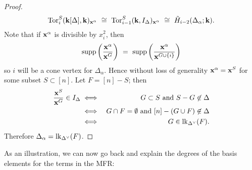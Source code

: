 \documentclass{amsart}
\newcommand{\link}{\mathop{\rm lk}\nolimits}
\newcommand{\Tor}{\mathop{\rm Tor}\nolimits}
\newcommand{\supp}{\mathop{\rm supp}\nolimits}
\newcommand{\fld}{{\bf k}}
\newcommand{\isom}{\cong}
\newcommand{\xx}{{\bf x}}
\begin{document}
\begin{proof}
	\begin{equation}
	\Tor^S_i(\fld[\Delta],\fld)_{\xx^\alpha} ~\isom~
	\Tor^S_{i-1}(\fld,I_\Delta)_{\xx^\alpha} ~\isom~
	\tilde H_{i-2}(\Delta_\alpha; \fld).
	\end{equation}
Note that if $\xx^\alpha$ is divisible by $x_i^2$, then
	$$\supp\left(\frac{\xx^\alpha}{\xx^G}\right) ~=~
	\supp\left(\frac{\xx^\alpha}{\xx^{G\cup\{i\}}}\right)$$
so $i$ will be a cone vertex for $\Delta_\alpha$.  Hence without loss of generality 
$\xx^\alpha = \xx^S$ for some subset $S \subset [n]$.  Let $F = [n]-S$; then
	\begin{eqnarray*}
	\frac{\xx^S}{\xx^G} \in I_\Delta &\iff& G \subset S ~\text{and}~ S-G \not\in \Delta \\
        &\iff& G \cap F = \emptyset ~\text{and}~ [n]-(G \cup F) \not\in \Delta \\
	&\iff& G \in \link_{\Delta^\vee}(F).
	\end{eqnarray*}
Therefore $\Delta_\alpha = \link_{\Delta^\vee}(F)$.
\end{proof}

As an illustration, we can now go back and explain the degrees of the
basis elements for the terms in the MFR:

\vfill
\end{document}
